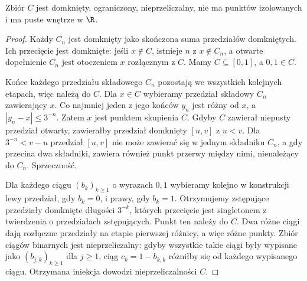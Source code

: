 \begin{twierdzenie}
\label{ma1:thm:cantor-properties}
Zbiór $C$ jest domknięty, ograniczony, nieprzeliczalny, nie ma punktów izolowanych i ma puste wnętrze w $\R$.
\end{twierdzenie}
\begin{proof}
Każdy $C_n$ jest domknięty jako skończona suma przedziałów domkniętych. Ich przecięcie jest domknięte: jeśli $x\notin C$, istnieje $n$ z $x\notin C_n$, a otwarte dopełnienie $C_n$ jest otoczeniem $x$ rozłącznym z $C$. Mamy $C\subseteq[0,1]$, a $0,1\in C$.

Końce każdego przedziału składowego $C_n$ pozostają we wszystkich kolejnych etapach, więc należą do $C$. Dla $x\in C$ wybieramy przedział składowy $C_n$ zawierający $x$. Co najmniej jeden z jego końców $y_n$ jest różny od $x$, a $|y_n-x|\le3^{-n}$. Zatem $x$ jest punktem skupienia $C$. Gdyby $C$ zawierał niepusty przedział otwarty, zawierałby przedział domknięty $[u,v]$ z $u<v$. Dla $3^{-n}<v-u$ przedział $[u,v]$ nie może zawierać się w jednym składniku $C_n$, a gdy przecina dwa składniki, zawiera również punkt przerwy między nimi, nienależący do $C_n$. Sprzeczność.

Dla każdego ciągu $(b_k)_{k\ge1}$ o wyrazach $0,1$ wybieramy kolejno w konstrukcji lewy przedział, gdy $b_k=0$, i prawy, gdy $b_k=1$. Otrzymujemy zstępujące przedziały domknięte długości $3^{-k}$, których przecięcie jest singletonem z twierdzenia o przedziałach zstępujących. Punkt ten należy do $C$. Dwa różne ciągi dają rozłączne przedziały na etapie pierwszej różnicy, a więc różne punkty. Zbiór ciągów binarnych jest nieprzeliczalny: gdyby wszystkie takie ciągi były wypisane jako $(b_{j,k})_{k\ge1}$ dla $j\ge1$, ciąg $c_k=1-b_{k,k}$ różniłby się od każdego wypisanego ciągu. Otrzymana iniekcja dowodzi nieprzeliczalności $C$.
\end{proof}
